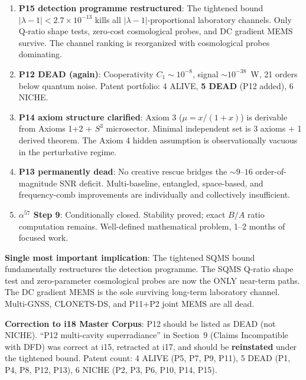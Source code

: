 \documentclass[11pt]{article}
\newcommand{\ee}[1]{\times 10^{#1}}
\newcommand{\lbone}{|\lambda - 1|}
\begin{document}
\begin{tcolorbox}[colback=green!5!white, colframe=green!60!black,
  title=\textbf{Programme Impact of W4i19 Findings}]

\begin{enumerate}[nosep]

\item \textbf{P15 detection programme restructured}: The tightened
  bound $\lbone < 2.7\ee{-13}$ kills all $\lbone$-proportional
  laboratory channels. Only Q-ratio shape tests, zero-cost cosmological
  probes, and DC gradient MEMS survive. The channel ranking is
  reorganized with cosmological probes dominating.

\item \textbf{P12 DEAD (again)}: Cooperativity $C_1 \sim 10^{-8}$,
  signal $\sim 10^{-38}$~W, 21 orders below quantum noise.
  Patent portfolio: 4 ALIVE, \textbf{5 DEAD} (P12 added), 6 NICHE.

\item \textbf{P14 axiom structure clarified}: Axiom 3 ($\mu = x/(1+x)$)
  is derivable from Axioms 1+2 + $S^3$ microsector. Minimal independent
  set is 3 axioms + 1 derived theorem. The Axiom 4 hidden assumption
  is observationally vacuous in the perturbative regime.

\item \textbf{P13 permanently dead}: No creative rescue bridges the
  $\sim 9$--$16$ order-of-magnitude SNR deficit. Multi-baseline,
  entangled, space-based, and frequency-comb improvements are
  individually and collectively insufficient.

\item \textbf{$\alpha^{57}$ Step 9}: Conditionally closed. Stability
  proved; exact $B/A$ ratio computation remains. Well-defined
  mathematical problem, 1--2 months of focused work.

\end{enumerate}

\textbf{Single most important implication}: The tightened SQMS bound
fundamentally restructures the detection programme. The SQMS Q-ratio
shape test and zero-parameter cosmological probes are now the ONLY
near-term paths. The DC gradient MEMS is the sole surviving long-term
laboratory channel. Multi-GNSS, CLONETS-DS, and P11+P2 joint MEMS
are all dead.

\textbf{Correction to i18 Master Corpus}: P12 should be listed as
DEAD (not NICHE). ``P12 multi-cavity superradiance'' in Section~9
(Claims Incompatible with DFD) was correct at i15, retracted at i17,
and should be \textbf{reinstated} under the tightened bound.
Patent count: 4 ALIVE (P5, P7, P9, P11), 5 DEAD (P1, P4, P8, P12,
P13), 6 NICHE (P2, P3, P6, P10, P14, P15).

\end{tcolorbox}
\end{document}
